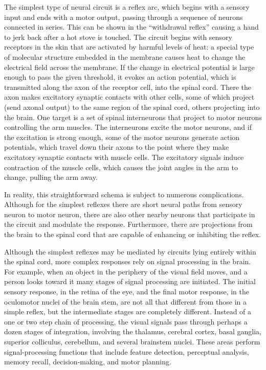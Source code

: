 The simplest type of neural circuit is a reflex arc, which begins with a sensory input and ends with a motor output, passing through a sequence of neurons connected in series. This can be shown in the ``withdrawal reflex'' causing a hand to jerk back after a hot stove is touched. The circuit begins with sensory receptors in the skin that are activated by harmful levels of heat: a special type of molecular structure embedded in the membrane causes heat to change the electrical field across the membrane. If the change in electrical potential is large enough to pass the given threshold, it evokes an action potential, which is transmitted along the axon of the receptor cell, into the spinal cord. There the axon makes excitatory synaptic contacts with other cells, some of which project (send axonal output) to the same region of the spinal cord, others projecting into the brain. One target is a set of spinal interneurons that project to motor neurons controlling the arm muscles. The interneurons excite the motor neurons, and if the excitation is strong enough, some of the motor neurons generate action potentials, which travel down their axons to the point where they make excitatory synaptic contacts with muscle cells. The excitatory signals induce contraction of the muscle cells, which causes the joint angles in the arm to change, pulling the arm away.

In reality, this straightforward schema is subject to numerous complications. Although for the simplest reflexes there are short neural paths from sensory neuron to motor neuron, there are also other nearby neurons that participate in the circuit and modulate the response. Furthermore, there are projections from the brain to the spinal cord that are capable of enhancing or inhibiting the reflex.

Although the simplest reflexes may be mediated by circuits lying entirely within the spinal cord, more complex responses rely on signal processing in the brain. For example, when an object in the periphery of the visual field moves, and a person looks toward it many stages of signal processing are initiated. The initial sensory response, in the retina of the eye, and the final motor response, in the oculomotor nuclei of the brain stem, are not all that different from those in a simple reflex, but the intermediate stages are completely different. Instead of a one or two step chain of processing, the visual signals pass through perhaps a dozen stages of integration, involving the thalamus, cerebral cortex, basal ganglia, superior colliculus, cerebellum, and several brainstem nuclei. These areas perform signal-processing functions that include feature detection, perceptual analysis, memory recall, decision-making, and motor planning.

